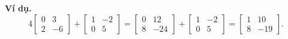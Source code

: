 \textbf{Ví dụ.}\[4\begin{bmatrix}
    0&3\\ 2&-6
\end{bmatrix}+\begin{bmatrix}
    1&-2\\ 0&5
\end{bmatrix}=\begin{bmatrix}
    0&12\\ 8&-24
\end{bmatrix}+\begin{bmatrix}
    1&-2\\ 0&5
\end{bmatrix}=\begin{bmatrix}
    1&10\\ 8&-19
\end{bmatrix}.\]
\vspace{8pt}

